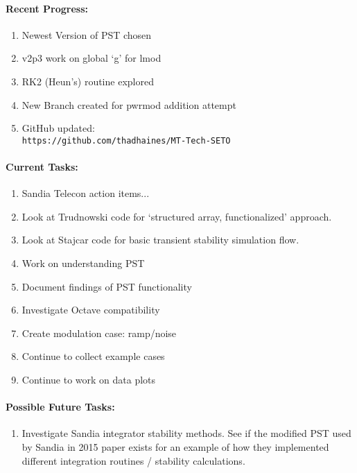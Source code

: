 \documentclass[12pt]{article}
\begin{document}
\begin{multicols}{2}
\raggedright

\paragraph{Recent Progress:}
	\begin{enumerate}
		\itemsep0em 
		\item Newest Version of PST chosen
		\item v2p3 work on global `g' for lmod
		\item RK2 (Heun's) routine explored
		\item New Branch created for pwrmod addition attempt
		\item GitHub updated:\\
	{\footnotesize	\verb|https://github.com/thadhaines/MT-Tech-SETO| }\\
	\end{enumerate}
	

	
\paragraph{Current Tasks:}
	\begin{enumerate}
		\itemsep 0em 
		\item Sandia Telecon action items...
		\item Look at Trudnowski code for `structured array, functionalized' approach.
		\item Look at Stajcar code for basic transient stability simulation flow.
		\item Work on understanding PST
		\item Document findings of PST functionality
		\item Investigate Octave compatibility
		\item Create modulation case: ramp/noise 
		\item Continue to collect example cases
		\item Continue to work on data plots 
\end{enumerate}

\paragraph{Possible Future Tasks:} %
	\begin{enumerate}
		\item Investigate Sandia integrator stability methods.	
		See if the modified PST used by Sandia in 2015 paper exists for an example of how they implemented different integration routines / stability calculations.	
	\end{enumerate}


\end{multicols}
\end{document}
